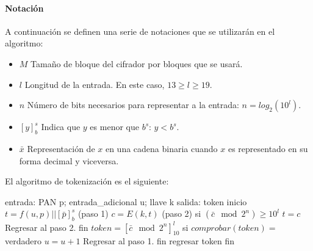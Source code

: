 \paragraph{Notación}
A continuación se definen una serie de notaciones que se utilizarán en el
algoritmo:
\begin{itemize}
  \item $ M $ Tamaño de bloque del cifrador por bloques que se usará.
  \item $ l $ Longitud de la entrada. En este caso, $13 \geq l \geq 19$.
  \item $ n $ Número de bits necesarios para representar a la entrada:
    $n = log_2(10^l)$.
  \item $ [y]^s_b $ Indica que $y$ es menor que $b^s$: $y < b^s$.
  \item $\bar{x}$ Representación de $x$ en una cadena binaria cuando $x$ es
    representado en su forma decimal y viceversa.
\end{itemize}


El algoritmo de tokenización es el siguiente:
\begin{pseudocodigo}[%
    caption={Híbrido reversible, método de tokenización}
  ]
    entrada: PAN p; entrada_adicional u; llave k
    salida:  token
    inicio
      $t = f(u, p) || [\bar{p}]^s_b$ (paso 1)
      $c = E(k, t)$ (paso 2)
      si $(\bar{c} \mod 2^n) \geq 10^l$
        $t = c$
        Regresar al paso 2.
      fin
      $token = {[\bar{c} \mod 2^n]}^l_{10}$
      si $comprobar(token) =$ verdadero
        $u = u + 1$
        Regresar al paso 1.
      fin
      regresar token
    fin
\end{pseudocodigo}
